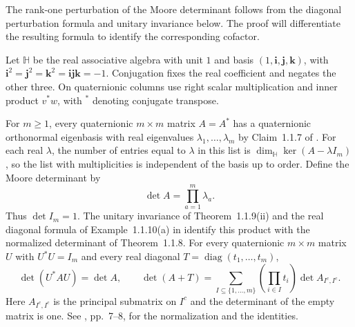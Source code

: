 The rank-one perturbation of the Moore determinant follows from the diagonal perturbation formula and unitary invariance below. The proof will differentiate the resulting formula to identify the corresponding cofactor.

\begin{Proposition}\label{ext:alesker-determinant}
Let $\mathbb H$ be the real associative algebra with unit $1$ and basis $(1,\mathbf i,\mathbf j,\mathbf k)$, with $\mathbf i^2=\mathbf j^2=\mathbf k^2=\mathbf i\mathbf j\mathbf k=-1$. Conjugation fixes the real coefficient and negates the other three. On quaternionic columns use right scalar multiplication and inner product $v^*w$, with $^*$ denoting conjugate transpose.

For $m\ge1$, every quaternionic $m\times m$ matrix $A=A^*$ has a quaternionic orthonormal eigenbasis with real eigenvalues $\lambda_1,\ldots,\lambda_m$ by Claim~1.1.7 of \cite{r-2}. For each real $\lambda$, the number of entries equal to $\lambda$ in this list is $\dim_{\mathbb H}\ker(A-\lambda I_m)$, so the list with multiplicities is independent of the basis up to order. Define the Moore determinant by
\[
 \det A=\prod_{a=1}^m\lambda_a.
\]
Thus $\det I_m=1$. The unitary invariance of Theorem~1.1.9(ii) and the real diagonal formula of Example~1.1.10(a) in \cite{r-2} identify this product with the normalized determinant of Theorem~1.1.8. For every quaternionic $m\times m$ matrix $U$ with $U^*U=I_m$ and every real diagonal $T=\operatorname{diag}(t_1,\ldots,t_m)$,
\[
 \det(U^*AU)=\det A,\qquad
 \det(A+T)=\sum_{I\subseteq\{1,\ldots,m\}}
          \left(\prod_{i\in I}t_i\right)\det A_{I^c,I^c}.
\]
Here $A_{I^c,I^c}$ is the principal submatrix on $I^c$ and the determinant of the empty matrix is one. See \cite{r-2}, pp.~7--8, for the normalization and the identities.
\end{Proposition}
